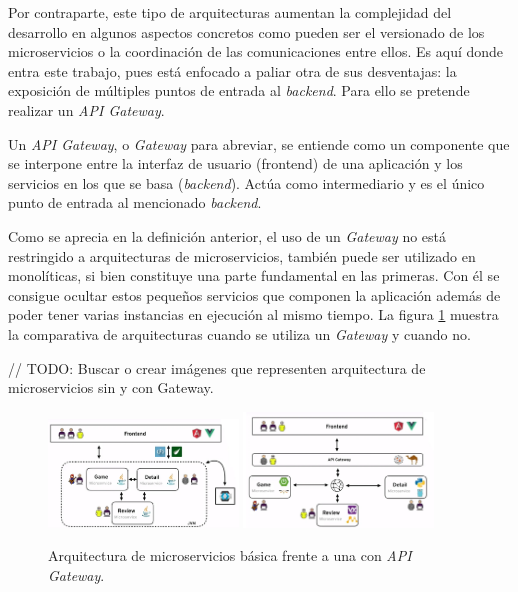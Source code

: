 \documentclass[11pt,spanish,listoffigures]{tfgetsinf}
\begin{document}
Por contraparte, este tipo de arquitecturas aumentan la complejidad del desarrollo en algunos aspectos concretos como pueden ser el versionado de los microservicios o la coordinación de las comunicaciones entre ellos. Es aquí donde entra este trabajo, pues está enfocado a paliar otra de sus desventajas: la exposición de múltiples puntos de entrada al \emph{backend}. Para ello se pretende realizar un \emph{API Gateway}.

Un \emph{API Gateway}, o \emph{Gateway} para abreviar, se entiende como un componente que se interpone entre la interfaz de usuario (frontend) de una aplicación y los servicios en los que se basa (\emph{backend}). Actúa como intermediario y es el único punto de entrada al mencionado \emph{backend}.

Como se aprecia en la definición anterior, el uso de un \emph{Gateway} no está restringido a arquitecturas de microservicios, también puede ser utilizado en monolíticas, si bien constituye una parte fundamental en las primeras. Con él se consigue ocultar estos pequeños servicios que componen la aplicación además de poder tener varias instancias en ejecución al mismo tiempo. La figura \ref{figura:gateway_o_no} muestra la comparativa de arquitecturas cuando se utiliza un \emph{Gateway} y cuando no.

// TODO: Buscar o crear imágenes que representen arquitectura de microservicios sin y con Gateway.
\begin{figure}[ht]
	\centering
	\label{figura:gateway_o_no}
	\includegraphics[width=0.45\textwidth]{images/arquitecturaMicroserviciosBasica}
	\includegraphics[width=0.45\textwidth]{images/arquitecturaMicroserviciosConGateway}
	\caption{Arquitectura de microservicios básica frente a una con \emph{API Gateway}.}
\end{figure}
\end{document}
